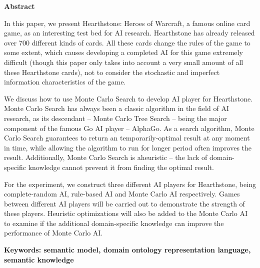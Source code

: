 \vspace{0.5cm}
{}
\centerline{\xiaoerhao \textbf{Abstract}}
\vspace{0.5cm}

In this paper, we present Hearthstone: Heroes of Warcraft, a famous online card game, as an interesting test bed for AI research. Hearthstone has already released over 700 different kinds of cards. All these cards change the rules of the game to some extent, which causes developing a completed AI for this game extremely difficult (though this paper only takes into account a very small amount of all these Hearthstone cards), not to consider the stochastic and imperfect information characteristics of the game.

We discuss how to use Monte Carlo Search to develop AI player for Hearthstone. Monte Carlo Search has always been a classic algorithm in the field of AI research, as its descendant -- Monte Carlo Tree Search -- being the major component of the famous Go AI player -- AlphaGo. As a search algorithm, Monte Carlo Search guarantees to return an temporarily-optimal result at any moment in time, while allowing the algorithm to run for longer period often improves the result. Additionally, Monte Carlo Search is aheuristic -- the lack of domain-specific knowledge cannot prevent it from finding the optimal result.

For the experiment, we construct three different AI players for Hearthstone, being complete-random AI, rule-based AI and Monte Carlo AI respectively. Games between different AI players will be carried out to demonstrate the strength of these players. Heuristic optimizations will also be added to the Monte Carlo AI to examine if the additional domain-specific knowledge can improve the performance of Monte Carlo AI.

{\bf Keywords: semantic model, domain ontology representation language, semantic knowledge}
